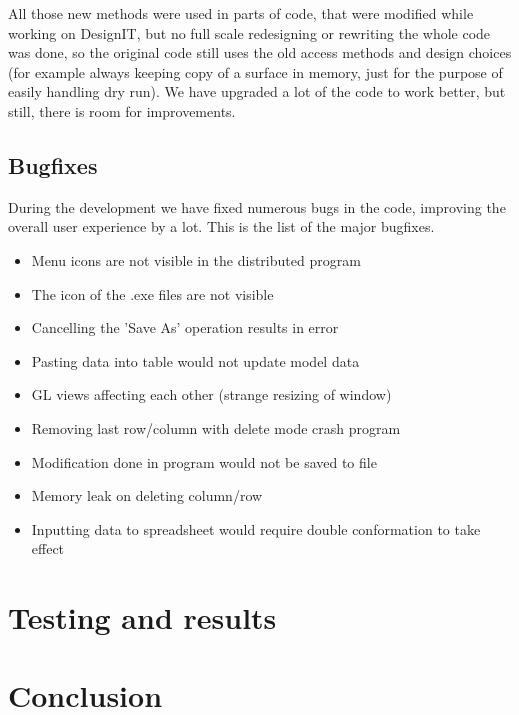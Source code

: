\documentclass[a4paper, 11pt, article]{report}
\begin{document}
All those new methods were used in parts of code, that were modified while working on DesignIT, but no full scale redesigning or rewriting the whole code was done, so the original code still uses the old access methods and design choices (for example always keeping copy of a surface in memory, just for the purpose of easily handling dry run). We have upgraded a lot of the code to work better, but still, there is room for improvements.

\section{Bugfixes}

During the development we have fixed numerous bugs in the code, improving the overall user experience by a lot. This is the list of the major bugfixes.

\begin{itemize}
\item Menu icons are not visible in the distributed program
\item The icon of the .exe files are not visible
\item Cancelling the 'Save As' operation results in error
\item Pasting data into table would not update model data
\item GL views affecting each other (strange resizing of window)
\item Removing last row/column with delete mode crash program
\item Modification done in program would not be saved to file
\item Memory leak on deleting column/row
\item Inputting data to spreadsheet would require double conformation to take effect
\end{itemize}


\chapter{Testing and results}


\chapter{Conclusion}
\end{document}
